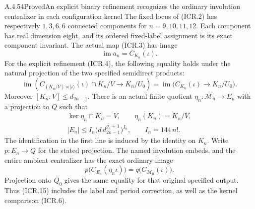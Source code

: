 \begin{result}{A.4.54}{Proved}{An explicit binary refinement recognizes the ordinary involution centralizer in each configuration kernel}
The fixed locus of (ICR.2) has respectively $1,3,6,6$ connected
components for $n=9,10,11,12$.  Each component has real dimension
eight, and its ordered fixed-label assignment is its exact component
invariant.  The actual map (ICR.3) has image
\[
                        \operatorname{im}a_n=C_{K_n}(\iota).
                                                               \tag{ICR.5}
\]
For the explicit refinement (ICR.4), the following equality holds
under the natural projection of the two specified semidirect products:
\[
 \operatorname{im}\left(
 C_{(K_n/V)\rtimes\langle\iota\rangle}(\iota)\cap K_n/V
                              \longrightarrow K_n/U_0\right)
               =\operatorname{im}\bigl(C_{K_n}(\iota)\to K_n/U_0\bigr).
                                                               \tag{ICR.6}
\]
Moreover $[K_n:V]\leq d_{2n-1}$.  There is an actual finite quotient
$\eta_n:\mathcal M_n\to E_n$ with a projection to $Q$ such that
\[
 \begin{gathered}
 \ker\eta_n\cap K_n=V,\qquad \eta_n(K_n)=K_n/V,\\
 |E_n|\leq I_n\bigl(d\,d_{2n-1}^{g_n+1}\bigr)^{I_n},
                  \qquad I_n=144\,n!.
 \end{gathered}                                                 \tag{ICR.7}
\]
The identification in the first line is induced by the identity on
$K_n$.  Write $p:E_n\to Q$ for the stated projection.  The named
involution embeds, and the entire ambient centralizer has the exact
ordinary image
\[
                 p\bigl(C_{E_n}(\eta_n\iota)\bigr)
                            =q\bigl(C_{\mathcal M_n}(\iota)\bigr).
                                                               \tag{ICR.15}
\]
Projection onto $Q_0$ gives the same equality for that original
specified output.  Thus (ICR.15) includes the label and period
correction, as well as the kernel comparison (ICR.6).
\end{result}

